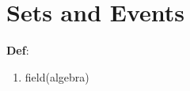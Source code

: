 \section{Sets and Events}
\label{sec:sets-events}
\textbf{Def}:
\begin{enumerate}
\item field(algebra)
\end{enumerate}



